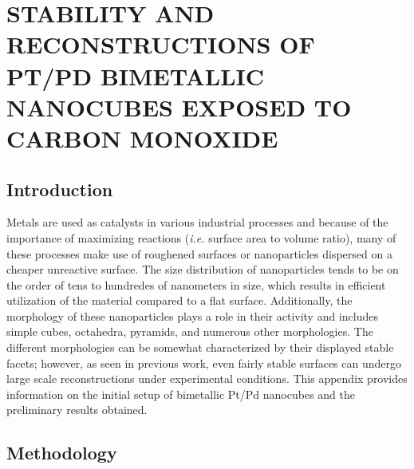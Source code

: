 
\chapter{STABILITY AND RECONSTRUCTIONS OF PT/PD BIMETALLIC NANOCUBES EXPOSED TO CARBON MONOXIDE}

\section{Introduction}

Metals are used as catalysts in various industrial processes and because of the
importance of maximizing reactions ({\em i.e.} surface area to volume ratio),
many of these processes make use of roughened surfaces or nanoparticles
dispersed on a cheaper unreactive surface.\citep{Munnik:2015qf, Graham:2007ng}
The size distribution of nanoparticles tends to be on the order of tens to
hundredes of nanometers in size, which results in efficient utilization of the
material compared to a flat surface.\citep{Zhang:2011ne, Liu:2013hf}
Additionally, the morphology of these nanoparticles plays a role in their
activity and includes simple cubes, octahedra, pyramids, and numerous other
morphologies.\citep{Ahmadi:2015os, Wang:2015qb, Wang:2016dg} The different
morphologies can be somewhat characterized by their displayed stable facets;
however, as seen in previous work\citep{Tao:2010aa, Michalka:2013aa,
Michalka:2015aa, Kim:2016cr}, even fairly stable surfaces can undergo large
scale reconstructions under experimental conditions. This appendix provides
information on the initial setup of bimetallic Pt/Pd nanocubes and the
preliminary results obtained. 

\section{Methodology}
